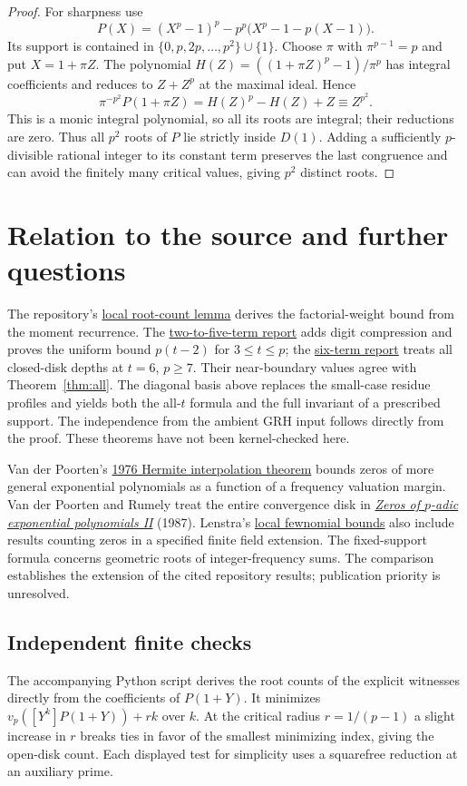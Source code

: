 \documentclass[11pt]{article}
\newcommand{\ord}{v_p}
\newcommand{\repo}[2]{\href{https://github.com/VladimirReshetnikov/ProveIt/blob/6d284fcf75bc3a91bb2e79ba7636f94724bff62c/Analysis/GeneralizedRiemannHypothesis/#1}{#2}}
\begin{document}
\begin{proof}
For sharpness use
\[
 P(X)=(X^p-1)^p-p^p\bigl(X^p-1-p(X-1)\bigr).
\]
Its support is contained in $\{0,p,2p,\ldots,p^2\}\cup\{1\}$. Choose $\pi$ with $\pi^{p-1}=p$ and put $X=1+\pi Z$. The polynomial $H(Z)=((1+\pi Z)^p-1)/\pi^p$ has integral coefficients and reduces to $Z+Z^p$ at the maximal ideal. Hence
\[
 \pi^{-p^2}P(1+\pi Z)=H(Z)^p-H(Z)+Z\equiv Z^{p^2}.
\]
This is a monic integral polynomial, so all its roots are integral; their reductions are zero. Thus all $p^2$ roots of $P$ lie strictly inside $D(1)$. Adding a sufficiently $p$-divisible rational integer to its constant term preserves the last congruence and can avoid the finitely many critical values, giving $p^2$ distinct roots. 
\end{proof}

\clearpage
\section{Relation to the source and further questions}
The repository's \repo{Article/sections/smd.tex}{local root-count lemma} derives the factorial-weight bound from the moment recurrence. The \repo{Research/padic-fewnomial-root-count/report.tex}{two-to-five-term report} adds digit compression and proves the uniform bound $p(t-2)$ for $3\le t\le p$; the \repo{Research/padic-six-term/report.tex}{six-term report} treats all closed-disk depths at $t=6$, $p\ge7$. Their near-boundary values agree with Theorem~\ref{thm:all}. The diagonal basis above replaces the small-case residue profiles and yields both the all-$t$ formula and the full invariant of a prescribed support. The independence from the ambient GRH input follows directly from the proof. These theorems have not been kernel-checked here.

Van der Poorten's \href{https://doi.org/10.1017/S144678870001332X}{1976 Hermite interpolation theorem} bounds zeros of more general exponential polynomials as a function of a frequency valuation margin. Van der Poorten and Rumely treat the entire convergence disk in \href{https://doi.org/10.1112/jlms/s2-36.1.1}{\emph{Zeros of $p$-adic exponential polynomials II}} (1987). Lenstra's \href{https://doi.org/10.1515/9783110285581.277}{local fewnomial bounds} also include results counting zeros in a specified finite field extension. The fixed-support formula concerns geometric roots of integer-frequency sums. The comparison establishes the extension of the cited repository results; publication priority is unresolved.

\subsection*{Independent finite checks}
The accompanying Python script derives the root counts of the explicit witnesses directly from the coefficients of $P(1+Y)$. It minimizes $\ord([Y^k]P(1+Y))+rk$ over $k$. At the critical radius $r=1/(p-1)$ a slight increase in $r$ breaks ties in favor of the smallest minimizing index, giving the open-disk count. Each displayed test for simplicity uses a squarefree reduction at an auxiliary prime.
\end{document}

